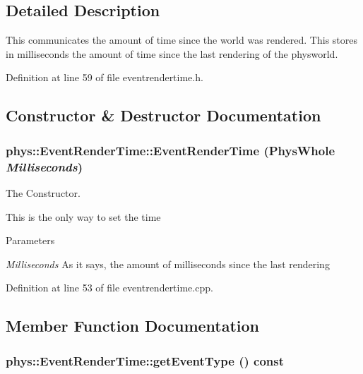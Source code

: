 \subsection{Detailed Description}
This communicates the amount of time since the world was rendered. This stores in milliseconds the amount of time since the last rendering of the physworld. 

Definition at line 59 of file eventrendertime.h.



\subsection{Constructor \& Destructor Documentation}
\hypertarget{classphys_1_1EventRenderTime_ac3c025af82c0a31369c0b6de28d7cab1}{
\subsubsection[{EventRenderTime}]{\setlength{\rightskip}{0pt plus 5cm}phys::EventRenderTime::EventRenderTime (PhysWhole {\em Milliseconds})}}
\label{d3/d8b/classphys_1_1EventRenderTime_ac3c025af82c0a31369c0b6de28d7cab1}


The Constructor. 

This is the only way to set the time 
\begin{DoxyParams}{Parameters}
\item[{\em Milliseconds}]As it says, the amount of milliseconds since the last rendering \end{DoxyParams}


Definition at line 53 of file eventrendertime.cpp.



\subsection{Member Function Documentation}
\hypertarget{classphys_1_1EventRenderTime_a66918bf3793196899621e4442a6f7a57}{
\subsubsection[{getEventType}]{ phys::EventRenderTime::getEventType () const}}
\label{d3/d8b/classphys_1_1EventRenderTime_a66918bf3793196899621e4442a6f7a57}


